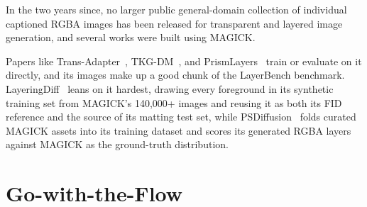 In the two years since, no larger public general-domain collection of individual captioned RGBA images has been released for transparent and layered image generation, and several works were built using MAGICK.

Papers like Trans-Adapter~\cite{dai2025transadapter}, TKG-DM~\cite{tkgdm2025}, and PrismLayers~\cite{prismlayers2025} train or evaluate on it directly, and its images make up a good chunk of the LayerBench benchmark. LayeringDiff~\cite{kang2025layeringdiff} leans on it hardest, drawing every foreground in its synthetic training set from MAGICK's 140,000+ images and reusing it as both its FID reference and the source of its matting test set, while PSDiffusion~\cite{huang2026psdiffusion} folds curated MAGICK assets into its training dataset and scores its generated RGBA layers against MAGICK as the ground-truth distribution. 

\section{Go-with-the-Flow}

